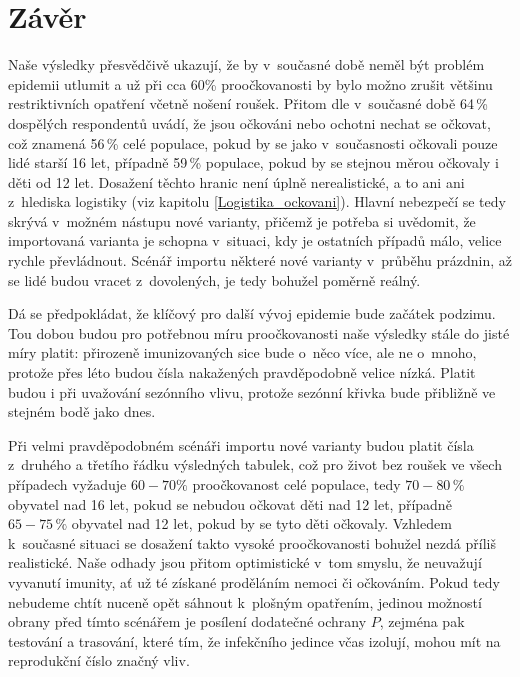 \section*{Závěr}

Naše výsledky přesvědčivě ukazují, že by v~současné době neměl být problém epidemii
utlumit a už při cca 60\% proočkovanosti
by bylo možno zrušit většinu restriktivních opatření včetně nošení roušek. Přitom dle \cite{paqcovid} v~současné době 64\,\% dospělých respondentů uvádí, že jsou očkováni nebo ochotni nechat se očkovat, což znamená 56\,\% celé populace, pokud by se jako v~současnosti očkovali pouze lidé starší 16 let, případně 59\,\% populace, pokud by se stejnou měrou očkovaly i děti od 12 let. Dosažení těchto hranic není úplně nerealistické, a to ani
ani z~hlediska logistiky (viz kapitolu \ref{Logistika_ockovani}). Hlavní nebezpečí se tedy
skrývá v~možném nástupu nové varianty, přičemž je potřeba si uvědomit,
že importovaná varianta je schopna v~situaci, kdy je ostatních
případů málo, velice rychle převládnout. Scénář importu některé
nové varianty v~průběhu prázdnin, až se lidé budou vracet z~dovolených, je
tedy bohužel poměrně reálný.

Dá se předpokládat, že klíčový pro další vývoj epidemie bude začátek podzimu. Tou dobou budou pro potřebnou míru proočkovanosti naše výsledky stále do jisté míry platit: přirozeně imunizovaných sice bude o~něco více, ale ne o~mnoho, protože přes léto budou čísla nakažených pravděpodobně velice nízká. Platit budou i při uvažování sezónního vlivu, protože sezónní křivka bude přibližně ve stejném bodě jako dnes. 

Při velmi pravděpodobném scénáři importu nové varianty budou platit čísla z~druhého a třetího řádku výsledných tabulek, což pro život bez roušek ve všech případech vyžaduje $60-70\%$ proočkovanost celé populace, tedy $70-80\,\%$ obyvatel nad 16 let, pokud se nebudou očkovat děti nad 12 let, případně $65-75\,\%$ obyvatel nad 12 let, pokud by se tyto děti očkovaly. Vzhledem k~současné situaci se dosažení takto vysoké proočkovanosti bohužel nezdá příliš realistické. Naše odhady jsou přitom optimistické v~tom smyslu, že neuvažují vyvanutí imunity, ať už té získané proděláním nemoci či očkováním.
Pokud tedy nebudeme chtít nuceně opět sáhnout k~plošným
opatřením, jedinou možností obrany před tímto scénářem je posílení
dodatečné ochrany $P$, zejména pak testování a trasování, které tím, že
infekčního jedince včas izolují, mohou mít na reprodukční číslo značný
vliv.